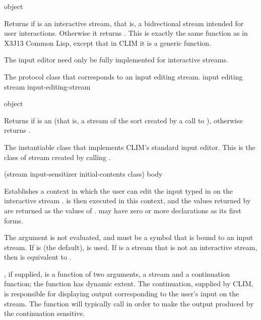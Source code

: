  {object}

Returns  if  is an interactive stream, that is, a
bidrectional stream intended for user interactions.  Otherwise it returns
.  This is exactly the same function as in X3J13 Common Lisp,
except that in CLIM it is a generic function.

The input editor need only be fully implemented for interactive streams.


The protocol class that corresponds to an input editing stream.
 {input editing stream} {input-editing-stream}

 {object}

Returns  if  is an  (that is,
a stream of the sort created by a call to ), otherwise
returns .


The instantiable class that implements CLIM's standard input editor.  This is
the class of stream created by calling .

\Mutable


 {(\optional stream 
                                 \key input-sensitizer initial-contents class)
                                \body body}

Establishes a context in which the user can edit the input typed in on the
interactive stream .   is then executed in this context,
and the values returned by  are returned as the values of
.   may have zero or more declarations as its
first forms.

The  argument is not evaluated, and must be a symbol that is bound
to an input stream.  If  is  (the default),
 is used.  If  is a stream that is not an
interactive stream, then  is equivalent to .

, if supplied, is a function of two arguments, a stream
and a continuation function; the function has dynamic extent.  The continuation,
supplied by CLIM, is responsible for displaying output corresponding to the
user's input on the stream.  The  function will typically call
 in order to make the output produced by the
continuation sensitive.

